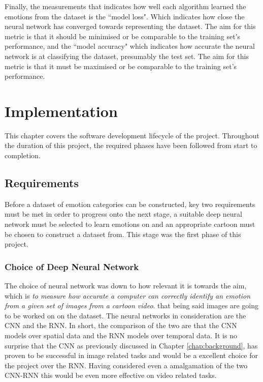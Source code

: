 \documentclass[report, 11pt, oneside]{dissertation}
\begin{document}
Finally, the measurements that indicates how well each algorithm learned the emotions from the dataset is the ``model loss". Which indicates how close the neural network has converged towards representing the dataset. The aim for this metric is that it should be minimised or be comparable to the training set's performance, and the ``model accuracy" which indicates how accurate the neural network is at classifying the dataset, presumably the test set. The aim for this metric is that it must be maximised or be comparable to the training set's performance.


\chapter{Implementation} \label{chap:implementation}

This chapter covers the software development lifecycle of the project. Throughout the duration of this project, the required phases have been followed from start to completion.

\section{Requirements}

Before a dataset of emotion categories can be constructed, key two requirements must be met in order to progress onto the next stage, a suitable deep neural network must be selected to learn emotions on and an appropriate cartoon must be chosen to construct a dataset from. This stage was the first phase of this project.

\subsection{Choice of Deep Neural Network}

The choice of neural network was down to how relevant it is towards the aim, which is \textit{to measure how accurate a computer can correctly identify an emotion from a given set of images from a cartoon video}. that being said images are going to be worked on on the dataset. The neural networks in consideration are the CNN and the RNN. In short, the comparison of the two are that the CNN models over spatial data and the RNN models over temporal data. It is no surprise that the CNN as previously discussed in Chapter \ref{chap:background}, has proven to be successful in image related tasks and would be a excellent choice for the project over the RNN. Having considered even a amalgamation of the two CNN-RNN this would be even more effective on video related tasks. 
\end{document}

